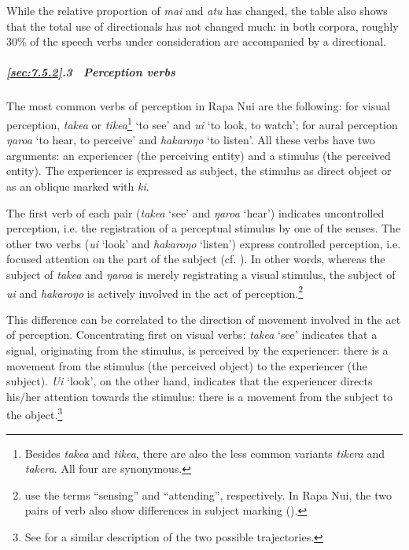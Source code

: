 While the relative proportion of \textit{mai} and \textit{atu} has changed, the table also shows that the total use of directionals has not changed much: in both corpora, roughly 30\% of the speech verbs under consideration are accompanied by a directional.

\subparagraph{\ref{sec:7.5.2}.3~ Perception verbs} The most common verbs of perception in Rapa Nui are the following: for visual perception, \textit{take{\ꞌ}a} or \textit{tike{\ꞌ}a}\footnote{\label{fn:363}Besides \textit{take{\ꞌ}a} and \textit{tike{\ꞌ}a}, there are also the less common variants \textit{tikera} and \textit{takera}. All four are synonymous.} ‘to see’ and \textit{u{\ꞌ}i} ‘to look, to watch’; for aural perception \textit{ŋaro{\ꞌ}a} ‘to hear, to perceive’ and \textit{hakaroŋo} ‘to listen’. All these verbs have two arguments: an experiencer (the perceiving entity) and a stimulus (the perceived entity). The experiencer is expressed as subject, the stimulus as direct object or as an oblique marked with \textit{ki}.

The first verb of each pair (\textit{take{\ꞌ}a} ‘see’ and \textit{ŋaro{\ꞌ}a} ‘hear’) indicates uncontrolled perception, i.e. the registration of a perceptual stimulus by one of the senses. The other two verbs (\textit{u{\ꞌ}i} ‘look’ and \textit{hakaroŋo} ‘listen’) express controlled perception, i.e. focused attention on the part of the subject (cf. \citealt[144]{Dixon2010-2}). In other words, whereas the subject of \textit{take{\ꞌ}a} and \textit{ŋaro{\ꞌ}a} is merely registrating a visual stimulus, the subject of \textit{u{\ꞌ}i} and \textit{hakaroŋo} is actively involved in the act of perception.\footnote{\label{fn:364}\citet{OsmondPawley2009} use the terms “sensing” and “attending”, respectively. In Rapa Nui, the two pairs of verb also show differences in subject marking ().}

This difference can be correlated to the direction of movement involved in the act of perception. Concentrating first on visual verbs: \textit{take{\ꞌ}a} ‘see’ indicates that a signal, originating from the stimulus, is perceived by the experiencer: there is a movement from the stimulus (the perceived object) to the experiencer (the subject). \textit{U{\ꞌ}i} ‘look’, on the other hand, indicates that the experiencer directs his/her attention towards the stimulus: there is a movement from the subject to the object.\footnote{\label{fn:365}See \citet[1745]{Hooper2004} for a similar description of the two possible trajectories.}

